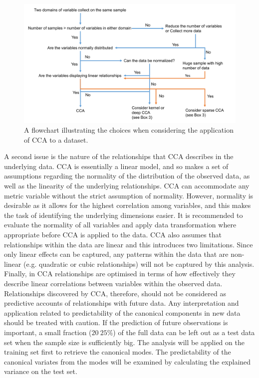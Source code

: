 \begin{figure}[H]
    \centering
    \includegraphics[width=1\textwidth]{cca/image/ccafig4.png}
    \caption{A flowchart illustrating the choices when considering the application of CCA to a dataset.}
    \label{fig:methods:fig4}
\end{figure}

A second issue is the nature of the relationships that CCA describes in the underlying data. CCA is essentially a linear model, and so makes a set of assumptions regarding the normality of the distribution of the observed data, as well as the linearity of the underlying relationships. CCA can accommodate any metric variable without the strict assumption of normality. However, normality is desirable as it allows for the highest correlation among variables, and this makes the task of identifying the underlying dimensions easier. It is recommended to evaluate the normality of all variables and apply data transformation where appropriate before CCA is applied to the data. CCA also assumes that relationships within the data are linear and this introduces two limitations. Since only linear effects can be captured, any patterns within the data that are non-linear (e.g. quadratic or cubic relationships) will not be captured by this analysis. Finally, in CCA relationships are optimised in terms of how effectively they describe linear correlations between variables within the observed data. Relationships discovered by CCA, therefore, should not be considered as predictive accounts of relationships with future data. Any interpretation and application related to predictability of the canonical components in new data should be treated with caution. If the prediction of future observations is important, a small fraction ($20~25\%$) of the full data can be left out as a test data set when the sample size is sufficiently big. The analysis will be applied on the training set first to retrieve the canonical modes. The predictability of the canonical variates from the modes will be examined by calculating the explained variance on the test set.  


